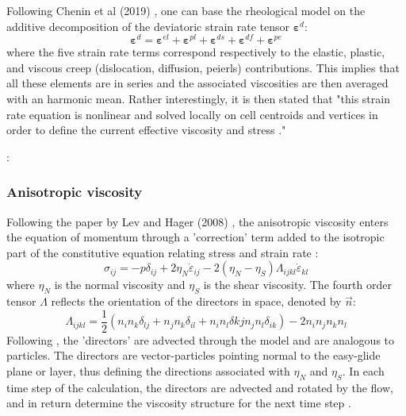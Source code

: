 \vspace{.5cm}

Following Chenin et al (2019) \cite{chmd19}, 
one can base the rheological model on the additive decomposition of the 
deviatoric strain rate tensor ${\bm \varepsilon}^d$:
\[
{\bm \varepsilon}^d =
{\bm \varepsilon}^{el}+
{\bm \varepsilon}^{pl}+
{\bm \varepsilon}^{ds}+
{\bm \varepsilon}^{df}+
{\bm \varepsilon}^{pe}
\]
where the five strain rate terms correspond respectively to the elastic, plastic, and viscous creep (dislocation, diffusion, peierls) contributions. This implies that all these elements are in series and the associated 
viscosities are then averaged with an harmonic mean. 
Rather interestingly, it is then stated that "this strain rate equation is nonlinear
and solved locally on cell centroids and vertices in order to define the current effective viscosity 
and stress \cite{poso08}."


\Literature: \cite{hoor89,lopr90,homo90,scps01,lova01,anpa19,egat10}

\subsubsection{Anisotropic viscosity}

Following the paper by Lev and Hager (2008) \cite{leha08}, 
the anisotropic viscosity enters the equation of momentum through a 'correction'
term added to the isotropic part of the constitutive equation relating
stress and strain rate \cite{mumh02}:
\[
\sigma_{ij} = -p \delta_{ij} + 2 \eta_N \dot{\varepsilon}_{ij}  - 2(\eta_N-\eta_S)\Lambda_{ijkl}\dot{\varepsilon}_{kl} 
\]
where $\eta_N$ is the normal viscosity and $\eta_S$ is the shear viscosity. 
The fourth order tensor $\Lambda$ reflects the orientation of the directors in space, 
denoted by $\vec{n}$:
\[
\Lambda_{ijkl}=\frac{1}{2} (n_i n_k \delta_{lj} + n_j n_k \delta_{il} + n_i n_l \delta{kj} n_j n_l \delta_{ik} )
- 2 n_i n_j n_k n_l 
\]
Following \cite{modm03,mumh02}, the 'directors' are advected through the model and are 
analogous to particles. The directors are
vector-particles pointing normal to the easy-glide plane or layer,
thus defining the directions associated with $\eta_N$ and $\eta_S$. 
In each time
step of the calculation, the directors are advected and rotated by the
flow, and in return determine the viscosity structure for the next time
step \cite{mumc04}.


